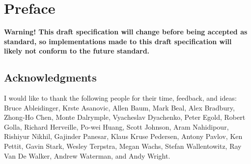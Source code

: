 \chapter{Preface}

{\bf Warning! This draft specification will change before being accepted as
standard, so implementations made to this draft specification will likely not
conform to the future standard.}


\section*{Acknowledgments}

I would like to thank the following people for their time, feedback, and ideas:
Bruce Ableidinger,
Krste Asanovic,
Allen Baum,
Mark Beal,
Alex Bradbury,
Zhong-Ho Chen,
Monte Dalrymple,
Vyacheslav Dyachenko,
Peter Egold,
Robert Golla,
Richard Herveille,
Po-wei Huang,
Scott Johnson,
Aram Nahidipour,
Rishiyur Nikhil,
Gajinder Panesar,
Klaus Kruse Pedersen,
Antony Pavlov,
Ken Pettit,
Gavin Stark,
Wesley Terpstra,
Megan Wachs,
Stefan Wallentowitz,
Ray Van De Walker,
Andrew Waterman,
and Andy Wright.
